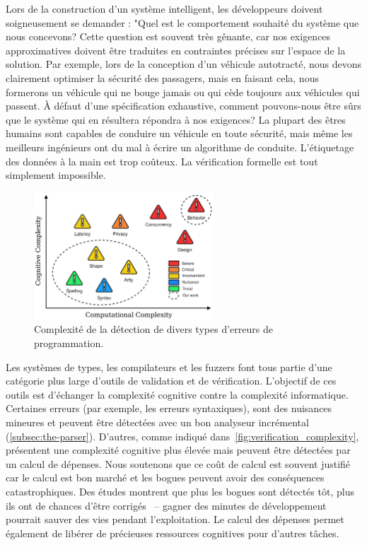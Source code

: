 Lors de la construction d'un système intelligent, les développeurs doivent soigneusement se demander : "Quel est le comportement souhaité du système que nous concevons? Cette question est souvent très gênante, car nos exigences approximatives doivent être traduites en contraintes précises sur l'espace de la solution. Par exemple, lors de la conception d'un véhicule autotracté, nous devons clairement optimiser la sécurité des passagers, mais en faisant cela, nous formerons un véhicule qui ne bouge jamais ou qui cède toujours aux véhicules qui passent. À défaut d'une spécification exhaustive, comment pouvons-nous être sûrs que le système qui en résultera répondra à nos exigences? La plupart des êtres humains sont capables de conduire un véhicule en toute sécurité, mais même les meilleurs ingénieurs ont du mal à écrire un algorithme de conduite. L'étiquetage des données à la main est trop coûteux. La vérification formelle est tout simplement impossible.

\begin{figure}
    \centering
    \includegraphics[width=0.60\textwidth]{../figures/verification_complexity.png}
    \caption{Complexité de la détection de divers types d'erreurs de programmation.}
    \label{fig:verification_complexity}
\end{figure}

Les systèmes de types, les compilateurs et les fuzzers font tous partie d'une catégorie plus large d'outils de validation et de vérification. L'objectif de ces outils est d'échanger la complexité cognitive contre la complexité informatique. Certaines erreurs (par exemple, les erreurs syntaxiques), sont des nuisances mineures et peuvent être détectées avec un bon analyseur incrémental (\autoref{subsec:the-parser}). D'autres, comme indiqué dans~\autoref{fig:verification_complexity}, présentent une complexité cognitive plus élevée mais peuvent être détectées par un calcul de dépenses. Nous soutenons que ce coût de calcul est souvent justifié car le calcul est bon marché et les bogues peuvent avoir des conséquences catastrophiques. Des études montrent que plus les bogues sont détectés tôt, plus ils ont de chances d'être corrigés~\citep{distefano2019scaling} -- gagner des minutes de développement pourrait sauver des vies pendant l'exploitation. Le calcul des dépenses permet également de libérer de précieuses ressources cognitives pour d'autres tâches.


